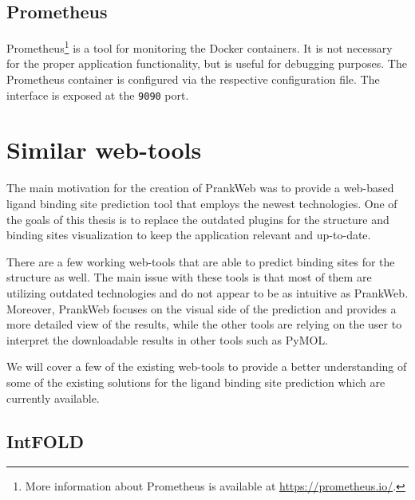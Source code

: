 
\subsection{Prometheus}
\label{subsec:prometheus}

Prometheus\footnote{More information about Prometheus is available at \url{https://prometheus.io/}.} is a tool for monitoring the Docker containers. It is not necessary for the proper application functionality, but is useful for debugging purposes. The Prometheus container is configured via the respective configuration file. The interface is exposed at the \texttt{9090} port.

\section{Similar web-tools}
\label{sec:similar_web_tools}

The main motivation for the creation of PrankWeb was to provide a web-based ligand binding site prediction tool that employs the newest technologies. One of the goals of this thesis is to replace the outdated plugins for the structure and binding sites visualization to keep the application relevant and up-to-date.

There are a few working web-tools that are able to predict binding sites for the structure as well. The main issue with these tools is that most of them are utilizing outdated technologies and do not appear to be as intuitive as PrankWeb\cite{jendele2019prankweb}. Moreover, PrankWeb focuses on the visual side of the prediction and provides a more detailed view of the results, while the other tools are relying on the user to interpret the downloadable results in other tools such as PyMOL.

We will cover a few of the existing web-tools to provide a better understanding of some of the existing solutions for the ligand binding site prediction which are currently available.

\subsection{IntFOLD}
\label{subsec:intfold}

